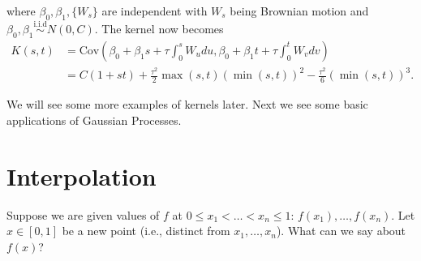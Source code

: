 \documentclass{scrartcl}
\begin{document}
\begin{enumerate}
\begin{equation*}
  \end{equation*}
  where $\beta_0, \beta_1, \{W_s\}$ are independent with $W_s$ being
  Brownian motion and $\beta_0, \beta_1 \overset{\text{i.i.d}}{\sim} N(0,
  C)$. The kernel now becomes
  \begin{align*}
    K(s, t) &= \text{Cov} \left(\beta_0 + \beta_1 s + \tau \int_0^s W_u du,
      \beta_0 + \beta_1 t + \tau \int_0^t W_v dv \right) \\ &= C (1 +
                                                              st) +
                                                              \frac{\tau^2}{2}
                                                              \max(s,
                                                              t)
                                                              \left(\min(s,
                                                              t)\right)^2
                                                              - 
    \frac{\tau^2}{6} \left(\min(s, t) \right)^3. 
  \end{align*}
\end{enumerate}
We will see some more examples of kernels later. Next we see some
basic applications of Gaussian Processes. 


\section{Interpolation}

Suppose we are given values of $f$ at $0 \leq x_1 < \dots < x_n \leq
1$: $f(x_1), 
\dots, f(x_n)$. Let $x \in [0, 1]$ be a new point (i.e., distinct from $x_1, \dots,
x_n$). What can we say about $f(x)$?
\end{document}
